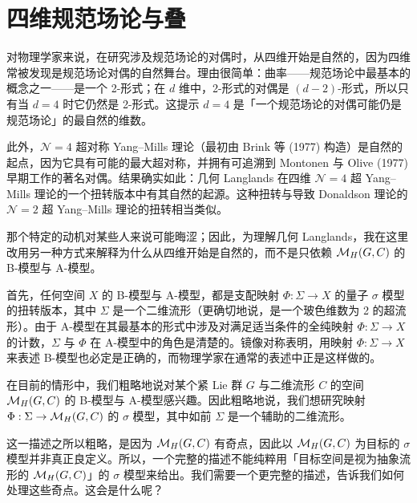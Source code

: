 \section{四维规范场论与叠}

对物理学家来说，在研究涉及规范场论的对偶时，从四维开始是自然的，因为四维常被发现是规范场论对偶的自然舞台。理由很简单：曲率——规范场论中最基本的概念之一——是一个 2-形式；在 $d$ 维中，2-形式的对偶是 $(d-2)$-形式，所以只有当 $d=4$ 时它仍然是 2-形式。这提示 $d=4$ 是「一个规范场论的对偶可能仍是规范场论」的最自然的维数。

此外，$\mathcal{N}=4$ 超对称 Yang--Mills 理论（最初由 Brink 等 (1977) 构造）是自然的起点，因为它具有可能的最大超对称，并拥有可追溯到 Montonen 与 Olive (1977) 早期工作的著名对偶。结果确实如此：几何 Langlands 在四维 $\mathcal{N}=4$ 超 Yang--Mills 理论的一个扭转版本中有其自然的起源。这种扭转与导致 Donaldson 理论的 $\mathcal{N}=2$ 超 Yang--Mills 理论的扭转相当类似。

那个特定的动机对某些人来说可能晦涩；因此，为理解几何 Langlands，我在这里改用另一种方式来解释为什么从四维开始是自然的，而不是只依赖 $\mathcal{M}_{H}(G,C)$ 的 B-模型与 A-模型。

首先，任何空间 $X$ 的 B-模型与 A-模型，都是支配映射 $\Phi:\Sigma\to X$ 的量子 $\sigma$ 模型的扭转版本，其中 $\Sigma$ 是一个二维流形（更确切地说，是一个玻色维数为 2 的超流形）。由于 A-模型在其最基本的形式中涉及对满足适当条件的全纯映射 $\Phi:\Sigma\to X$ 的计数，$\Sigma$ 与 $\Phi$ 在 A-模型中的角色是清楚的。镜像对称表明，用映射 $\Phi:\Sigma\to X$ 来表述 B-模型也必定是正确的，而物理学家在通常的表述中正是这样做的。

在目前的情形中，我们粗略地说对某个紧 Lie 群 $G$ 与二维流形 $C$ 的空间 $\mathcal{M}_{H}(G,C)$ 的 B-模型与 A-模型感兴趣。因此粗略地说，我们想研究映射 $\Phi:\Sigma\to\mathcal{M}_{H}(G,C)$ 的 $\sigma$ 模型，其中如前 $\Sigma$ 是一个辅助的二维流形。

这一描述之所以粗略，是因为 $\mathcal{M}_{H}(G,C)$ 有奇点，因此以 $\mathcal{M}_{H}(G,C)$ 为目标的 $\sigma$ 模型并非真正良定义。所以，一个完整的描述不能纯粹用「目标空间是视为抽象流形的 $\mathcal{M}_{H}(G,C)$」的 $\sigma$ 模型来给出。我们需要一个更完整的描述，告诉我们如何处理这些奇点。这会是什么呢？

